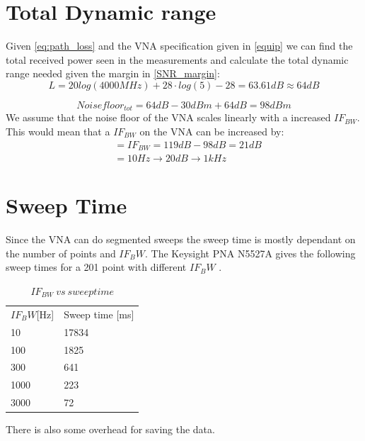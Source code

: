 \section{Total Dynamic range}
Given \autoref{eq:path_loss} and the VNA specification given in \autoref{equip} we can find the total received power seen in the measurements and calculate the total dynamic range needed given the margin in \autoref{SNR_margin}:
\begin{equation}
L = 20log (4000MHz) + 28 \cdot log(5)-28 = 63.61dB \approx 64dB
\end{equation}

\begin{equation}
Noisefloor_{tot} = 64dB - 30dBm + 64dB = 98dBm 
\end{equation}
We assume that the noise floor of the \gls{VNA} scales linearly with a increased $IF_{BW}$. This would mean that a $IF_{BW}$ on the \gls{VNA} can be increased by:
\begin{equation}
\begin{split}
&= IF_{BW} = 119dB-98dB = 21dB \\
           &= 10Hz \rightarrow 20dB \rightarrow 1kHz
\end{split}
\end{equation}
\section{Sweep Time}
Since the \gls{VNA} can do segmented sweeps the sweep time is mostly dependant on the number of points and $IF_BW$.
The Keysight PNA N5527A gives the following sweep times for a 201 point with different $IF_BW$ \citep{Key_PNA}.

\begin{table}[H]
\centering
\caption{$IF_{BW} \ vs \ sweep time$}
\label{my-label}
\begin{tabular}{l|l}
\hline
$IF_BW${[}Hz{]} & Sweep time {[}ms{]} \\
10              & 17834               \\
100             & 1825                \\
300             & 641                 \\
1000            & 223                 \\
3000            & 72                 
\end{tabular}
\end{table}


There is also some overhead for saving the data.
